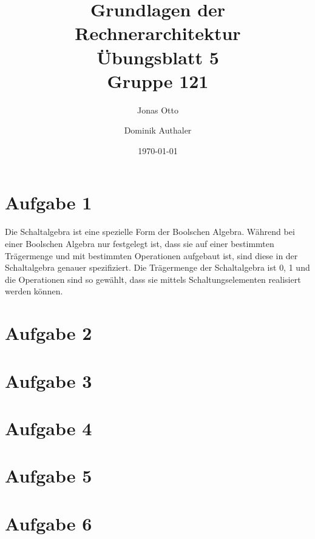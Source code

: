 \documentclass[a4paper]{article}
\title{Grundlagen der Rechnerarchitektur\\ Übungsblatt 5\\Gruppe 121\\}
\author{Jonas Otto\and Dominik Authaler}
\date{\today}
\begin{document}
\maketitle

\section*{Aufgabe 1}
Die Schaltalgebra ist eine spezielle Form der Boolschen Algebra. Während bei einer Boolschen Algebra nur festgelegt ist, dass sie auf einer bestimmten Trägermenge und mit bestimmten Operationen aufgebaut ist, sind diese in der Schaltalgebra genauer spezifiziert. Die Trägermenge der Schaltalgebra ist {0, 1} und die Operationen sind so gewählt, dass sie mittels Schaltungselementen realisiert werden können.

\section*{Aufgabe 2}

\section*{Aufgabe 3}
\section*{Aufgabe 4}
\section*{Aufgabe 5}
\section*{Aufgabe 6}
\end{document}

